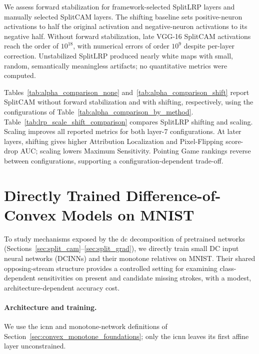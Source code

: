 We assess forward stabilization for framework-selected SplitLRP layers and manually selected SplitCAM layers. The shifting baseline sets positive-neuron activations to half the original activation and negative-neuron activations to its negative half. Without forward stabilization, late VGG-16 SplitCAM activations reach the order of $10^{18}$, with numerical errors of order $10^{9}$ despite per-layer correction. Unstabilized SplitLRP produced nearly white maps with small, random, semantically meaningless artifacts; no quantitative metrics were computed.

Tables~\ref{tab:alpha_comparison_none} and~\ref{tab:alpha_comparison_shift} report SplitCAM without forward stabilization and with shifting, respectively, using the configurations of Table~\ref{tab:alpha_comparison_by_method}. Table~\ref{tab:lrp_scale_shift_comparison} compares SplitLRP shifting and scaling. Scaling improves all reported metrics for both layer-7 configurations. At later layers, shifting gives higher Attribution Localization and Pixel-Flipping score-drop AUC; scaling lowers Maximum Sensitivity. Pointing Game rankings reverse between configurations, supporting a configuration-dependent trade-off.





\section{Directly Trained Difference-of-Convex Models on MNIST}\label{sec:dcinns}

To study mechanisms exposed by the \ac{dc} decomposition of pretrained networks (Sections~\ref{sec:split_cam}--\ref{sec:split_grad}), we directly train small DC input neural networks (DCINNs) and their monotone relatives on MNIST. Their shared opposing-stream structure provides a controlled setting for examining class-dependent sensitivities on present and candidate missing strokes, with a modest, architecture-dependent accuracy cost.

\paragraph{Architecture and training.}\label{subsec:dcinn_architecture}

We use the \ac{icnn} and monotone-network definitions of Section~\ref{sec:convex_monotone_foundations}; only the \ac{icnn} leaves its first affine layer unconstrained.

